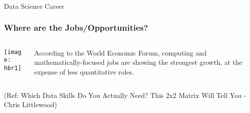 \begin{frame}[fragile]\frametitle{}
\begin{center}
{\Large Data Science Career}
\end{center}
\end{frame}

\begin{frame}[fragile]\frametitle{Where are the Jobs/Opportunities?}
 
   \begin{columns}[t]
    \begin{column}{0.6\linewidth}
\begin{center}
\texttt{[image: hbr1]}
\end{center}
    \end{column}
    \begin{column}{0.4\linewidth}
	 According to the World Economic Forum, computing and mathematically-focused jobs are showing the strongest growth, at the expense of less quantitative roles.
    \end{column}
  \end{columns}
 

{\tiny (Ref: Which Data Skills Do You Actually Need? This 2x2 Matrix Will Tell You - Chris Littlewood)}
\end{frame}


